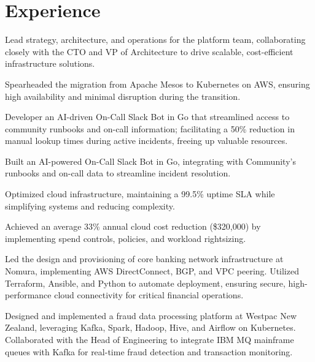 \documentclass[]{resume}
\begin{document}
\begin{minipage}[t]{0.65\textwidth}
\section{Experience}
\vspace{\topsep} %
\begin{tightemize}
\item Lead strategy, architecture, and operations for the platform team, collaborating closely with the CTO and VP of Architecture to drive scalable, cost-efficient infrastructure solutions.
\item Spearheaded the migration from Apache Mesos to Kubernetes on AWS, ensuring high availability and minimal disruption during the transition.
\item Developer an AI-driven On-Call Slack Bot in Go that streamlined access to community runbooks and on-call information; facilitating a 50\% reduction in manual lookup times during active incidents, freeing up valuable resources.
\item Built an AI-powered On-Call Slack Bot in Go, integrating with Community’s runbooks and on-call data to streamline incident resolution.
\item Optimized cloud infrastructure, maintaining a 99.5\% uptime SLA while simplifying systems and reducing complexity.
\item Achieved an average 33\% annual cloud cost reduction (\$320,000) by implementing spend controls, policies, and workload rightsizing.
\end{tightemize}
\sectionsep

\begin{tightemize}
\item Led the design and provisioning of core banking network infrastructure at Nomura, implementing AWS DirectConnect, BGP, and VPC peering. Utilized Terraform, Ansible, and Python to automate deployment, ensuring secure, high-performance cloud connectivity for critical financial operations.
\end{tightemize}
\sectionsep

\begin{tightemize}
\item Designed and implemented a fraud data processing platform at Westpac New Zealand, leveraging Kafka, Spark, Hadoop, Hive, and Airflow on Kubernetes. Collaborated with the Head of Engineering to integrate IBM MQ mainframe queues with Kafka for real-time fraud detection and transaction monitoring.
\end{tightemize}
\sectionsep


\end{minipage}
\end{document}
